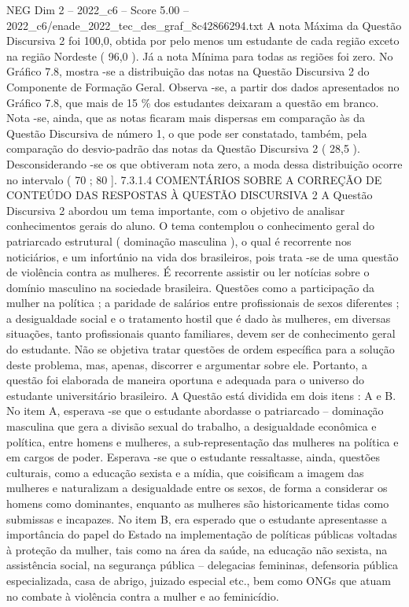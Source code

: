 \begin{textsample}{NEG Dim 2 – 2022\_c6 – Score 5.00 – 2022\_c6/enade\_2022\_tec\_des\_graf\_8c42866294.txt}
A nota Máxima da Questão Discursiva 2 foi 100,0, obtida por pelo menos um estudante de cada região exceto na região Nordeste ( 96,0 ).
Já a nota Mínima para todas as regiões foi zero.
No Gráfico 7.8, mostra -se a distribuição das notas na Questão Discursiva 2 do Componente de Formação Geral.
Observa -se, a partir dos dados apresentados no Gráfico 7.8, que mais de 15 \% dos estudantes deixaram a questão em branco.
Nota -se, ainda, que as notas ficaram mais dispersas em comparação às da Questão Discursiva de número 1, o que pode ser constatado, também, pela comparação do desvio-padrão das notas da Questão Discursiva 2 ( 28,5 ).
Desconsiderando -se os que obtiveram nota zero, a moda dessa distribuição ocorre no intervalo ( 70 ; 80 ]. 7.3.1.4 COMENTÁRIOS SOBRE A CORREÇÃO DE CONTEÚDO DAS RESPOSTAS À QUESTÃO DISCURSIVA 2 A Questão Discursiva 2 abordou um tema importante, com o objetivo de analisar conhecimentos gerais do aluno.
O tema contemplou o conhecimento geral do patriarcado estrutural ( dominação masculina ), o qual é recorrente nos noticiários, e um infortúnio na vida dos brasileiros, pois trata -se de uma questão de violência contra as mulheres.
É recorrente assistir ou ler notícias sobre o domínio masculino na sociedade brasileira.
Questões como a participação da mulher na política ; a paridade de salários entre profissionais de sexos diferentes ; a desigualdade social e o tratamento hostil que é dado às mulheres, em diversas situações, tanto profissionais quanto familiares, devem ser de conhecimento geral do estudante.
Não se objetiva tratar questões de ordem específica para a solução deste problema, mas, apenas, discorrer e argumentar sobre ele.
Portanto, a questão foi elaborada de maneira oportuna e adequada para o universo do estudante universitário brasileiro.
A Questão está dividida em dois itens : A e B.
No item A, esperava -se que o estudante abordasse o patriarcado – dominação masculina que gera a divisão sexual do trabalho, a desigualdade econômica e política, entre homens e mulheres, a sub-representação das mulheres na política e em cargos de poder.
Esperava -se que o estudante ressaltasse, ainda, questões culturais, como a educação sexista e a mídia, que coisificam a imagem das mulheres e naturalizam a desigualdade entre os sexos, de forma a considerar os homens como dominantes, enquanto as mulheres são historicamente tidas como submissas e incapazes.
No item B, era esperado que o estudante apresentasse a importância do papel do Estado na implementação de políticas públicas voltadas à proteção da mulher, tais como na área da saúde, na educação não sexista, na assistência social, na segurança pública – delegacias femininas, defensoria pública especializada, casa de abrigo, juizado especial etc., bem como ONGs que atuam no combate à violência contra a mulher e ao feminicídio.

\end{textsample}
